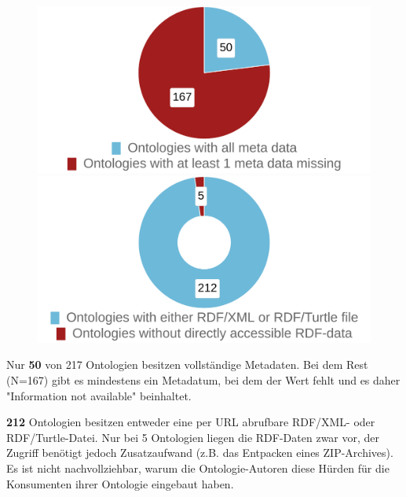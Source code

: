 \documentclass{article}
\begin{document}
\begin{figure}[H]
    \begin{minipage}[c]{0.4\linewidth}
        \includegraphics[scale=0.14]{pie-complete-incomplete-metadata}
        \caption{}
    \end{minipage}
    \hfill
    \begin{minipage}[c]{0.4\linewidth}
        \centering
        \includegraphics[scale=0.14]{pie-files-download-location}
        \caption{}
    \end{minipage}%
\end{figure}

Nur \textbf{50} von 217 Ontologien besitzen vollständige Metadaten.
Bei dem Rest (N=167) gibt es mindestens ein Metadatum, bei dem der Wert fehlt und es daher "Information not available" beinhaltet.

\textbf{212} Ontologien besitzen entweder eine per URL abrufbare RDF/XML- oder RDF/Turtle-Datei.
Nur bei 5 Ontologien liegen die RDF-Daten zwar vor, der Zugriff benötigt jedoch Zusatzaufwand (z.B. das Entpacken eines ZIP-Archives).
Es ist nicht nachvollziehbar, warum die Ontologie-Autoren diese Hürden für die Konsumenten ihrer Ontologie eingebaut haben.
\end{document}
